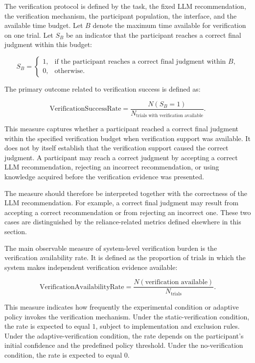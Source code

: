 \documentclass[oneside,final,14pt,a4paper]{extreport}
\theoremstyle{definition}
\theoremstyle{remark}
\begin{document}
The verification protocol is defined by the task, the fixed LLM
recommendation, the verification mechanism, the participant population, the
interface, and the available time budget. Let \(B\) denote the maximum time
available for verification on one trial. Let \(S_B\) be an indicator that the
participant reaches a correct final judgment within this budget:

\[
S_B =
\begin{cases}
1, & \text{if the participant reaches a correct final judgment within } B,\\
0, & \text{otherwise.}
\end{cases}
\]

The primary outcome related to verification success is defined as:

\[
\text{VerificationSuccessRate}
=
\frac{
N(S_B=1)
}{
N_{\text{trials with verification available}}
}.
\]

This measure captures whether a participant reached a correct final judgment
within the specified verification budget when verification support was
available. It does not by itself establish that the verification support
caused the correct judgment. A participant may reach a correct judgment by
accepting a correct LLM recommendation, rejecting an incorrect recommendation,
or using knowledge acquired before the verification evidence was presented.

The measure should therefore be interpreted together with the correctness of the
LLM recommendation. For example, a correct final judgment may result from
accepting a correct recommendation or from rejecting an incorrect one. These
two cases are distinguished by the reliance-related metrics defined elsewhere
in this section.

The main observable measure of system-level verification burden is the
verification availability rate. It is defined as the proportion of trials in
which the system makes independent verification evidence available:

\[
\text{VerificationAvailabilityRate}
=
\frac{
N(\text{verification available})
}{
N_{\text{trials}}
}.
\]

This measure indicates how frequently the experimental condition or adaptive
policy invokes the verification mechanism. Under the static-verification
condition, the rate is expected to equal \(1\), subject to implementation and
exclusion rules. Under the adaptive-verification condition, the rate depends on
the participant's initial confidence and the predefined policy threshold. Under
the no-verification condition, the rate is expected to equal \(0\).
\end{document}
